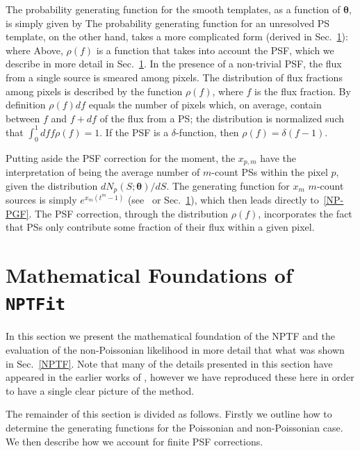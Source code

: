 The probability generating function for the smooth templates, as a function of ${\bm \theta}$, is simply given by
The probability generating function for an unresolved PS template, on the other hand, takes a more complicated form (derived in Sec.~\ref{details}):
where
Above, $\rho(f)$ is a function that takes into account the PSF, which we describe in more detail in Sec.~\ref{details}.  In the presence of a non-trivial PSF, the flux from a single source is smeared among pixels.  The distribution of flux fractions among pixels is described by the function $\rho(f)$, where $f$ is the flux fraction.  By definition $\rho(f) df$ equals the number of pixels which, on average, contain between $f$ and $f+ df$ of the flux from a PS; the distribution is normalized such that $ \int_0^1 df f \rho(f) = 1$.  If the PSF is a $\delta$-function, then $\rho(f) = \delta(f-1)$.

Putting aside the PSF correction for the moment, the $x_{p,m}$ have the interpretation of being the average number of $m$-count PSs within the pixel $p$, given the distribution $ dN_p(S;{\bm \theta})/dS $.  The generating function for $x_m$ $m$-count sources is simply $e^{x_m(t^m - 1)}$ (see~\cite{Malyshev:2011zi} or Sec.~\ref{details}), which then leads directly to~\eqref{NP-PGF}.  The PSF correction, through the distribution $\rho(f)$, incorporates the fact that PSs only contribute some fraction of their flux within a given pixel.

\section{Mathematical Foundations of \texttt{NPTFit}}
\label{details}

In this section we present the mathematical foundation of the NPTF and the evaluation of the non-Poissonian likelihood in more detail that what was shown in Sec.~\ref{NPTF}. Note that many of the details presented in this section have appeared in the earlier works of \cite{Malyshev:2011zi,Lee:2014mza,Lee:2015fea}, however we have reproduced these here in order to have a single clear picture of the method.

The remainder of this section is divided as follows. Firstly we outline how to determine the generating functions for the Poissonian and non-Poissonian case. We then describe how we account for finite PSF corrections.


